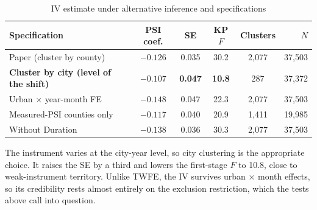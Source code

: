 \documentclass[11pt]{article}
\begin{document}
\begin{table}[H]\centering\small
\caption{IV estimate under alternative inference and specifications}
\begin{tabular}{lccccr}
\toprule
Specification & PSI coef. & SE & KP $F$ & Clusters & $N$\\
\midrule
Paper (cluster by county) & $-0.126$ & 0.035 & 30.2 & 2,077 & 37,503\\
\textbf{Cluster by city (level of the shift)} & $-0.107$ & \textbf{0.047} & \textbf{10.8} & 287 & 37,372\\
Urban $\times$ year-month FE & $-0.148$ & 0.047 & 22.3 & 2,077 & 37,503\\
Measured-PSI counties only & $-0.117$ & 0.040 & 20.9 & 1,411 & 19,985\\
Without Duration & $-0.138$ & 0.036 & 30.3 & 2,077 & 37,503\\
\bottomrule
\end{tabular}
\end{table}
\noindent The instrument varies at the city-year level, so city clustering is the appropriate choice. It raises the SE by a third and lowers the first-stage $F$ to 10.8, close to weak-instrument territory. Unlike TWFE, the IV survives urban $\times$ month effects, so its credibility rests almost entirely on the exclusion restriction, which the tests above call into question.

\end{document}
